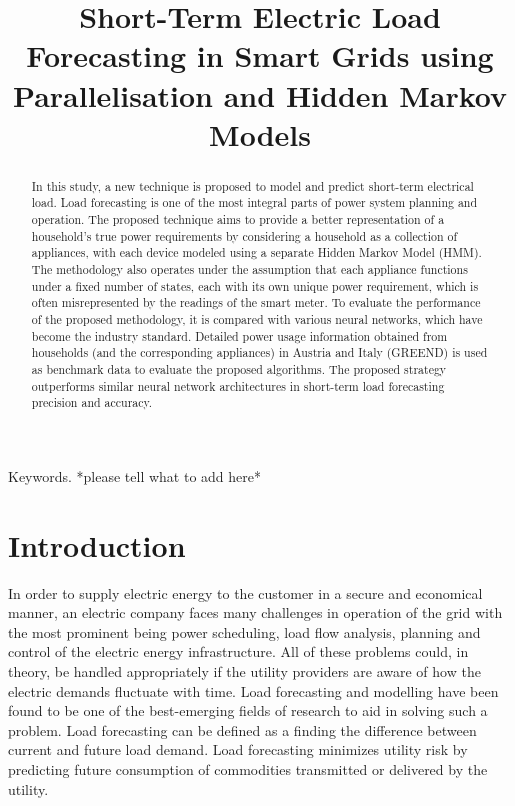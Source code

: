 \documentclass[conference]{IEEEtran}
\begin{document}
\title{Short-Term Electric Load Forecasting in Smart Grids using Parallelisation and Hidden Markov Models}

\author{
}

\maketitle

\begin{abstract}
In this study, a new technique is proposed to model and predict short-term electrical load. Load forecasting is one of the most integral parts of power system planning and operation. The proposed technique aims to provide a better representation of a household's true power requirements by considering a household as a collection of appliances, with each device modeled using a separate Hidden Markov Model (HMM). The methodology also operates under the assumption that each appliance functions under a fixed number of states, each with its own unique power requirement, which is often misrepresented by the readings of the smart meter. To evaluate the performance of the proposed methodology, it is compared with various neural networks, which have become the industry standard. Detailed power usage information obtained from households (and the corresponding appliances) in Austria and Italy (GREEND) is used as benchmark data to evaluate the proposed algorithms. The proposed strategy outperforms similar neural network architectures in short-term load forecasting precision and accuracy.
\end{abstract}

\begin{IEEEkeywords}
Keywords. *please tell what to add here*
\end{IEEEkeywords}
\section{Introduction}

In order to supply electric energy to the customer in a secure and economical manner, an electric company faces many challenges in operation of the grid with the most prominent being power scheduling, load flow analysis, planning and control of the electric energy infrastructure. All of these problems could, in theory, be handled appropriately if the utility providers are aware of how the electric demands fluctuate with time. Load forecasting and modelling have been found to be one of the best-emerging fields of research to aid in solving such a problem. Load forecasting can be defined as a finding the difference between current and future load demand. Load forecasting minimizes utility risk by predicting future consumption of commodities transmitted or delivered by the utility. 
\end{document}
